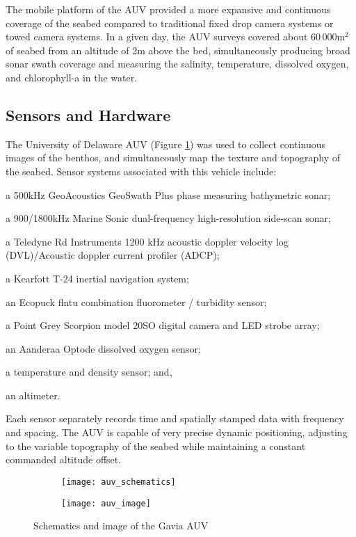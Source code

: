 The mobile platform of the AUV provided a more expansive and continuous coverage 
of the seabed compared to traditional fixed drop camera systems or towed camera systems. 
In a given day, the AUV surveys covered about $60\,000$\;m$^2$ of seabed 
from an altitude of 2\;m above the bed, simultaneously producing broad sonar 
swath coverage and measuring the salinity, temperature, dissolved oxygen, and 
chlorophyll-a  in the water.


\subsection{Sensors and Hardware}
\label{section:equipment}

The University of Delaware AUV (Figure \ref{fig:gavia_auv}) was used to collect 
continuous images of the benthos, and simultaneously map the texture and topography of 
the seabed. Sensor systems associated with this vehicle include: \begin{enumerate*}[label=(\arabic*):, start=1] 
\item a 500\;kHz GeoAcoustics GeoSwath Plus phase measuring bathymetric 
sonar; \item a 900/1800\;kHz Marine Sonic dual-frequency high-resolution 
side-scan sonar; 
\item a Teledyne Rd Instruments 1200 kHz acoustic doppler velocity log (DVL)/Acoustic doppler current profiler (ADCP); 
\item a Kearfott T-24 inertial navigation system; 
\item an Ecopuck flntu combination fluorometer / turbidity sensor; 
\item a Point Grey Scorpion model 20SO digital camera and LED strobe array; 
\item an Aanderaa Optode dissolved oxygen sensor; 
\item a temperature and density sensor; and, \item an altimeter. \end{enumerate*} 
Each sensor separately records time and spatially stamped data with frequency and spacing.
The AUV is capable of very precise dynamic positioning, adjusting to the variable 
topography of the seabed while maintaining a constant commanded altitude offset.

\begin{figure}
  \centering
  \begin{subfigure}[]{0.7\textwidth}
      \texttt{[image: auv\_schematics]}
  \end{subfigure}
  \begin{subfigure}[]{0.6\textwidth}
      \texttt{[image: auv\_image]}    
  \end{subfigure}
  \caption{Schematics and image of the Gavia AUV }
  \label{fig:gavia_auv}
\end{figure}


